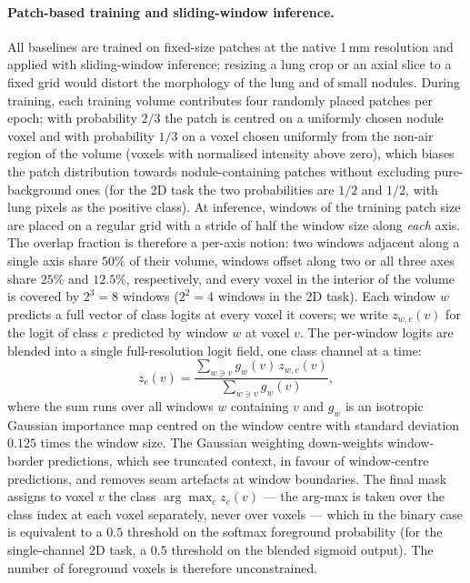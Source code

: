 \paragraph{Patch-based training and sliding-window inference.}
All baselines are trained on fixed-size patches at the native 1\,mm resolution and applied with sliding-window inference; resizing a lung crop or an axial slice to a fixed grid would distort the morphology of the lung and of small nodules.
During training, each training volume contributes four randomly placed patches per epoch; with probability $2/3$ the patch is centred on a uniformly chosen nodule voxel and with probability $1/3$ on a voxel chosen uniformly from the non-air region of the volume (voxels with normalised intensity above zero), which biases the patch distribution towards nodule-containing patches without excluding pure-background ones (for the 2D task the two probabilities are $1/2$ and $1/2$, with lung pixels as the positive class).
At inference, windows of the training patch size are placed on a regular grid with a stride of half the window size along \emph{each} axis. The overlap fraction is therefore a per-axis notion: two windows adjacent along a single axis share $50\%$ of their volume, windows offset along two or all three axes share $25\%$ and $12.5\%$, respectively, and every voxel in the interior of the volume is covered by $2^3 = 8$ windows ($2^2 = 4$ windows in the 2D task).
Each window $w$ predicts a full vector of class logits at every voxel it covers; we write $z_{w,c}(v)$ for the logit of class $c$ predicted by window $w$ at voxel $v$. The per-window logits are blended into a single full-resolution logit field, one class channel at a time:
\begin{equation*}
z_c(v) = \frac{\sum_{w \ni v} g_w(v)\, z_{w,c}(v)}{\sum_{w \ni v} g_w(v)},
\end{equation*}
where the sum runs over all windows $w$ containing $v$ and $g_w$ is an isotropic Gaussian importance map centred on the window centre with standard deviation $0.125$ times the window size. The Gaussian weighting down-weights window-border predictions, which see truncated context, in favour of window-centre predictions, and removes seam artefacts at window boundaries. The final mask assigns to voxel $v$ the class $\arg\max_c z_c(v)$ — the arg-max is taken over the class index at each voxel separately, never over voxels — which in the binary case is equivalent to a $0.5$ threshold on the softmax foreground probability (for the single-channel 2D task, a $0.5$ threshold on the blended sigmoid output). The number of foreground voxels is therefore unconstrained.

